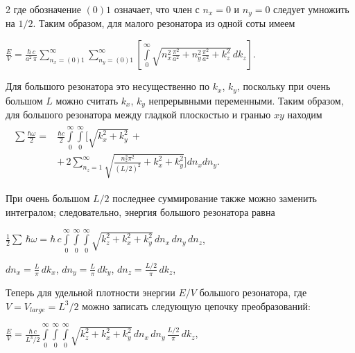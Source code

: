 \documentclass[twoside, 10pt]{article}
\begin{document}
\begin{multicols}{2}
    где обозначение \(\left(0\right) 1\) означает, что член с \(n_x = 0\) и \(n_y = 0\) следует умножить на \(1\big/2\). Таким образом, для малого резонатора из одной соты имеем

    \(\frac{E}{V} = \frac{\hbar\,c}{a^2\,\pi}\sum\limits_{n_x=(0)1}^{\infty}\sum\limits_{n_y=(0)1}^{\infty}\left[\int\limits_{0}^{\infty}\sqrt{n_x^2\frac{\pi^2}{a^2}+n_y^2\frac{\pi^2}{a^2}+k_z^2}\,dk_z\right]\).

    Для большого резонатора это несущественно по \(k_x\), \(k_y\), поскольку при очень большом \(L\) можно считать \(k_x\), \(k_y\) непрерывными переменными. Таким образом, для большого резонатора между гладкой плоскостью и гранью \(xy\) находим
\noindent
\(\begin{array}{c}
\begin{array}{ll}
    \sum\frac{\hbar\omega}{2} = & \frac{\hbar c}{2}\int\limits_{0}^{\infty}\int\limits_{0}^{\infty}\Bigg[\sqrt{k_x^2+k_y^2}\,+ \\
   & +\,2\sum\limits_{n_z=1}^{\infty}\sqrt{\frac{n_z^2 \pi^2}{(L/2)^2}+k_x^2+k_y^2}\Bigg]d{n_x}d{n_y}.
\end{array}
\end{array}\)


    При очень большом \(L/2\) последнее суммирование также можно заменить интегралом; следовательно, энергия большого резонатора равна

    \(\frac{1}{2}\sum\,\hbar\omega = \hbar\,c\int\limits_{0}^{\infty}\int\limits_{0}^{\infty}\int\limits_{0}^{\infty}\sqrt{k_z^2+k_x^2+k_y^2}\,d{n_x}\,d{n_y}\,d{n_z}\),

    \(dn_x = \frac{L}{\pi}\,dk_x\), \(dn_y = \frac{L}{\pi}\,dk_y\),
\(dn_z = \frac{L/2}{\pi}\,dk_z\),

    Теперь для удельной плотности энергии \(E/V\) большого резонатора, где
\(V = V_{large} = L^3/2\) можно записать следующую цепочку преобразований:

\noindent
    \(\frac{E}{V} = \frac{\hbar\,c}{L^3/2}\int\limits_{0}^{\infty}\int\limits_{0}^{\infty}\int\limits_{0}^{\infty}\sqrt{k_z^2+k_x^2+k_y^2}\,dn_x\,dn_y\,\frac{L/2}{\pi}\,dk_z\),



\end{multicols}
\end{document}
